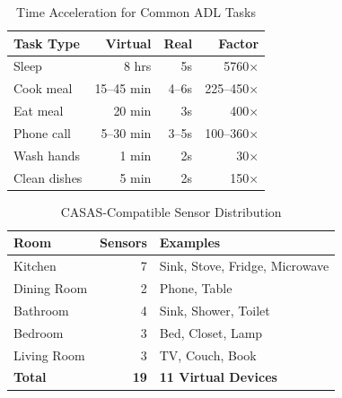 
\begin{table}[t]
\centering
\caption{Time Acceleration for Common ADL Tasks}
\label{tab:time_acceleration_compact}
\small
\begin{tabular}{@{}lrrr@{}}
\toprule
\textbf{Task Type} & \textbf{Virtual} & \textbf{Real} & \textbf{Factor} \\
\midrule
Sleep & 8 hrs & 5s & 5760$\times$ \\
Cook meal & 15--45 min & 4--6s & 225--450$\times$ \\
Eat meal & 20 min & 3s & 400$\times$ \\
Phone call & 5--30 min & 3--5s & 100--360$\times$ \\
Wash hands & 1 min & 2s & 30$\times$ \\
Clean dishes & 5 min & 2s & 150$\times$ \\
\bottomrule
\end{tabular}
\end{table}

\begin{table}[t]
\centering
\caption{CASAS-Compatible Sensor Distribution}
\label{tab:sensor_summary}
\small
\begin{tabular}{@{}lrl@{}}
\toprule
\textbf{Room} & \textbf{Sensors} & \textbf{Examples} \\
\midrule
Kitchen & 7 & Sink, Stove, Fridge, Microwave \\
Dining Room & 2 & Phone, Table \\
Bathroom & 4 & Sink, Shower, Toilet \\
Bedroom & 3 & Bed, Closet, Lamp \\
Living Room & 3 & TV, Couch, Book \\
\midrule
\textbf{Total} & \textbf{19} & \textbf{11 Virtual Devices} \\
\bottomrule
\end{tabular}
\end{table}


